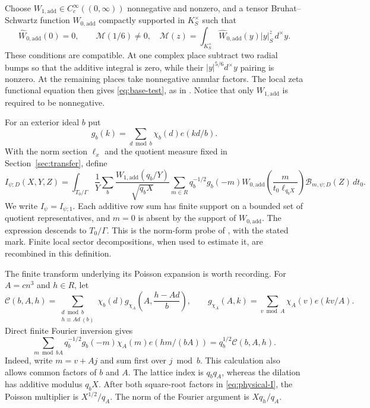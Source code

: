 \documentclass[11pt,a4paper]{article}
\numberwithin{equation}{section}
\theoremstyle{definition}
\theoremstyle{remark}
\begin{document}
Choose $W_{1,\mathrm{add}}\in C_c^\infty((0,\infty))$ nonnegative and
nonzero, and a tensor Bruhat--Schwartz function
$W_{0,\mathrm{add}}$ compactly supported in $K_S^\times$ such that
\begin{equation}\label{eq:base-test}
 \widehat W_{0,\mathrm{add}}(0)=0,\qquad
 \mathcal M(1/6)\ne0,
 \quad
 \mathcal M(z)=\int_{K_S^\times}
       \widehat W_{0,\mathrm{add}}(y)|y|_S^z\,d^\times y.
\end{equation}
These conditions are compatible.  At one complex place subtract two
radial bumps so that the additive integral is zero, while their
$|y|^{5/6}d^\times y$ pairing is nonzero.  At the remaining places take
nonnegative annular factors.  The local zeta functional equation then gives
\eqref{eq:base-test}, as in \cite[equations~(7.1)--(7.2)]{P}.  Notice that only
$W_{1,\mathrm{add}}$ is required to be nonnegative.

For an exterior ideal $b$ put
\[
 g_b(k)=\sum_{d\bmod b}\chi_b(d)e(kd/b).
\]
With the norm section $\ell_x$ and the quotient measure fixed in
Section~\ref{sec:transfer}, define
\begin{equation}\label{eq:physical-I}
 I_{\psi;D}(X,Y,Z)=
 \int_{T_0/\Gamma}\frac1Y\sum_b
 \frac{W_{1,\mathrm{add}}(q_b/Y)}{\sqrt{q_bX}}
 \sum_{m\in R}q_b^{-1/2}g_b(-m)
 W_{0,\mathrm{add}}\!\left(\frac{m}{t_0\ell_{q_bX}}\right)
 \mathcal B_{m,\psi;D}(Z)\,dt_0.
\end{equation}
We write $I_\psi=I_{\psi;1}$.  Each additive row sum has finite support
on a bounded set of quotient representatives, and $m=0$ is absent by the
support of $W_{0,\mathrm{add}}$.  The expression descends to $T_0/\Gamma$.
This is the norm-form probe of \cite[equation~(7.3)]{P}, with the stated mark.
Finite local sector decompositions, when used to estimate it, are recombined
in this definition.

The finite transform underlying its Poisson expansion is worth recording.
For $A=cn^3$ and $h\in R$, let
\[
 \mathscr C(b,A,h)=
 \sum_{\substack{d\bmod b\\h\equiv Ad\ (b)}}
   \chi_b(d)g_{\chi_A}\!\left(A,\frac{h-Ad}{b}\right),
 \qquad
 g_{\chi_A}(A,k)=\sum_{v\bmod A}\chi_A(v)e(kv/A).
\]
Direct finite Fourier inversion gives
\begin{equation}\label{eq:finite-probe}
 \sum_{m\bmod bA}q_b^{-1/2}g_b(-m)\chi_A(m)e(hm/(bA))
      =q_b^{1/2}\mathscr C(b,A,h).
\end{equation}
Indeed, write $m=v+Aj$ and sum first over $j\bmod b$.
This calculation also allows common factors of $b$ and $A$.
The lattice index is $q_bq_A$, whereas the dilation has additive modulus
$q_bX$.  After both square-root factors in \eqref{eq:physical-I}, the
Poisson multiplier is $X^{1/2}/q_A$.  The norm of the Fourier argument is
$Xq_h/q_A$.
\end{document}
